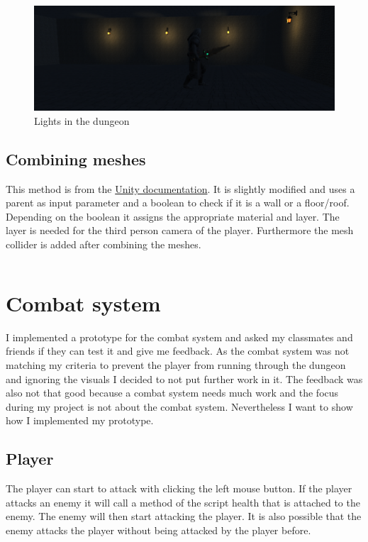 \documentclass[a4paper,11pt,oneside]{scrreprt}
\begin{document}
\begin{figure}[htb]
	\centering
	\includegraphics[scale=0.5]{images/lights.png}   
	\caption{Lights in the dungeon}
	\label{fig:lights}
\end{figure}

\subsection{Combining meshes}
This method is from the \href{https://docs.unity3d.com/ScriptReference/Mesh.CombineMeshes.html}{Unity documentation}. It is slightly modified and uses a parent as input parameter and a boolean to check if it is a wall or a floor/roof. 
\\
Depending on the boolean it assigns the appropriate material and layer. The layer is needed for the third person camera of the player. Furthermore the mesh collider is added after combining the meshes.
\inputminted[fontsize=\footnotesize,linenos]{csharp}{code/CombineMeshes.cs}


\section{Combat system}
I implemented a prototype for the combat system and asked my classmates and friends if they can test it and give me feedback. As the combat system was not matching my criteria to prevent the player from running through the dungeon and ignoring the visuals I decided to not put further work in it. The feedback was also not that good because a combat system needs much work and the focus during my project is not about the combat system. Nevertheless I want to show how I implemented my prototype.
\subsection{Player}
The player can start to attack with clicking the left mouse button. If the player attacks an enemy it will call a method of the script health that is attached to the enemy. The enemy will then start attacking the player. It is also possible that the enemy attacks the player without being attacked by the player before. 
\inputminted[fontsize=\footnotesize,linenos]{csharp}{code/Player.cs}
\end{document}
